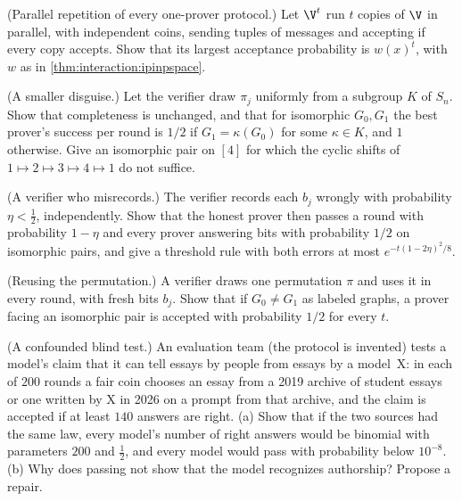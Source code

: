 \begin{refsection}
\begin{exercises}
\item \consolidation\hard (Parallel repetition of every one-prover protocol.) Let $\V^t$ run $t$ copies of $\V$ in parallel, with independent coins, sending tuples of messages and accepting if every copy accepts. Show that its largest acceptance probability is $w(x)^t$, with $w$ as in \cref{thm:interaction:ipinpspace}. \label{ex:interaction:parallel}

\item \variation (A smaller disguise.) Let the verifier draw $\pi_j$ uniformly from a subgroup $K$ of $S_n$. Show that completeness is unchanged, and that for isomorphic $G_0,G_1$ the best prover's success per round is $1/2$ if $G_1=\kappa(G_0)$ for some $\kappa\in K$, and $1$ otherwise. Give an isomorphic pair on $[4]$ for which the cyclic shifts of $1\mapsto2\mapsto3\mapsto4\mapsto1$ do not suffice.\label{ex:interaction:subgroup}

\item \variation (A verifier who misrecords.) The verifier records each $b_j$ wrongly with probability $\eta<\frac12$, independently. Show that the honest prover then passes a round with probability $1-\eta$ and every prover answering bits with probability $1/2$ on isomorphic pairs, and give a threshold rule with both errors at most $e^{-t(1-2\eta)^2/8}$.\label{ex:interaction:noisy}

\item \attack (Reusing the permutation.) A verifier draws one permutation $\pi$ and uses it in every round, with fresh bits $b_j$. Show that if $G_0\ne G_1$ as labeled graphs, a prover facing an isomorphic pair is accepted with probability $1/2$ for every $t$. \label{ex:interaction:samepi}

\item \attack (A confounded blind test.) An evaluation team (the protocol is invented) tests a model's claim that it can tell essays by people from essays by a model~X: in each of $200$ rounds a fair coin chooses an essay from a 2019 archive of student essays or one written by X in 2026 on a prompt from that archive, and the claim is accepted if at least $140$ answers are right. (a) Show that if the two sources had the same law, every model's number of right answers would be binomial with parameters $200$ and $\frac12$, and every model would pass with probability below $10^{-8}$. (b) Why does passing not show that the model recognizes authorship? Propose a repair.\label{ex:interaction:confound}


\end{exercises}
\end{refsection}
